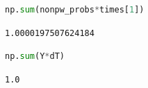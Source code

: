 \begin{lstlisting}[language=Python]
np.sum(nonpw_probs*times[1])
\end{lstlisting}

\begin{lstlisting}
1.0000197507624184
\end{lstlisting}

\begin{lstlisting}[language=Python]
np.sum(Y*dT)
\end{lstlisting}

\begin{lstlisting}
1.0
\end{lstlisting}

\begin{lstlisting}[language=Python]
\end{lstlisting}
